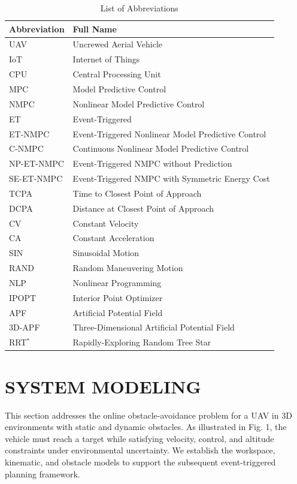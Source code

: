 \documentclass[lettersize,journal]{IEEEtran}
\begin{document}
\begin{table}[t]
	\centering
	\caption{List of Abbreviations}
	\label{tab:abbreviations}
	\footnotesize
	\renewcommand{\arraystretch}{1.12}
	\begin{tabular}{@{} p{} p{} @{}}
		\toprule
		\textbf{Abbreviation} & \textbf{Full Name} \\
		\midrule
		UAV & Uncrewed Aerial Vehicle \\
		IoT & Internet of Things \\
		CPU & Central Processing Unit \\
		MPC & Model Predictive Control \\
		NMPC & Nonlinear Model Predictive Control \\
		ET & Event-Triggered \\
		ET-NMPC & Event-Triggered Nonlinear Model Predictive Control \\
		C-NMPC & Continuous Nonlinear Model Predictive Control \\
		NP-ET-NMPC & Event-Triggered NMPC without Prediction \\
		SE-ET-NMPC & Event-Triggered NMPC with Symmetric Energy Cost \\
		TCPA & Time to Closest Point of Approach \\
		DCPA & Distance at Closest Point of Approach \\
		CV & Constant Velocity \\
		CA & Constant Acceleration \\
		SIN & Sinusoidal Motion \\
		RAND & Random Maneuvering Motion \\
		NLP & Nonlinear Programming \\
		IPOPT & Interior Point Optimizer \\
		APF & Artificial Potential Field \\
		3D-APF & Three-Dimensional Artificial Potential Field \\
		RRT$^\ast$ & Rapidly-Exploring Random Tree Star \\
		\bottomrule
	\end{tabular}
\end{table}

\section{SYSTEM MODELING}

This section addresses the online obstacle-avoidance problem for a UAV in 3D environments with static and dynamic obstacles. As illustrated in Fig. 1, the vehicle must reach a target while satisfying velocity, control, and altitude constraints under environmental uncertainty. We establish the workspace, kinematic, and obstacle models to support the subsequent event-triggered planning framework.
\end{document}
